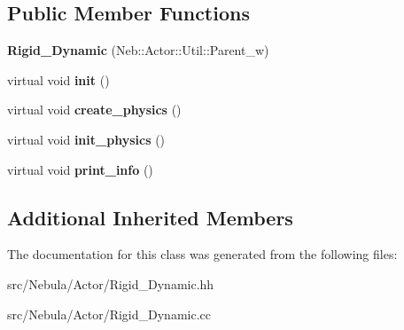 \subsection*{Public Member Functions}
\begin{DoxyCompactItemize}
\item 
\hypertarget{classNeb_1_1Actor_1_1Rigid__Dynamic_a1e179487de04b8ac0343c079431b73ab}{{\bfseries Rigid\-\_\-\-Dynamic} (Neb\-::\-Actor\-::\-Util\-::\-Parent\-\_\-w)}\label{classNeb_1_1Actor_1_1Rigid__Dynamic_a1e179487de04b8ac0343c079431b73ab}

\item 
\hypertarget{classNeb_1_1Actor_1_1Rigid__Dynamic_a9878cbd5451a01b9afaea0add3d12090}{virtual void {\bfseries init} ()}\label{classNeb_1_1Actor_1_1Rigid__Dynamic_a9878cbd5451a01b9afaea0add3d12090}

\item 
\hypertarget{classNeb_1_1Actor_1_1Rigid__Dynamic_a784a6718627cfa55994668c388c648e9}{virtual void {\bfseries create\-\_\-physics} ()}\label{classNeb_1_1Actor_1_1Rigid__Dynamic_a784a6718627cfa55994668c388c648e9}

\item 
\hypertarget{classNeb_1_1Actor_1_1Rigid__Dynamic_a25c3a55aa487167fbc7bc30078f3e03c}{virtual void {\bfseries init\-\_\-physics} ()}\label{classNeb_1_1Actor_1_1Rigid__Dynamic_a25c3a55aa487167fbc7bc30078f3e03c}

\item 
\hypertarget{classNeb_1_1Actor_1_1Rigid__Dynamic_a3f0eef890a878fb76d1572aa3a0c66ae}{virtual void {\bfseries print\-\_\-info} ()}\label{classNeb_1_1Actor_1_1Rigid__Dynamic_a3f0eef890a878fb76d1572aa3a0c66ae}

\end{DoxyCompactItemize}
\subsection*{Additional Inherited Members}


The documentation for this class was generated from the following files\-:\begin{DoxyCompactItemize}
\item 
src/\-Nebula/\-Actor/Rigid\-\_\-\-Dynamic.\-hh\item 
src/\-Nebula/\-Actor/Rigid\-\_\-\-Dynamic.\-cc\end{DoxyCompactItemize}
